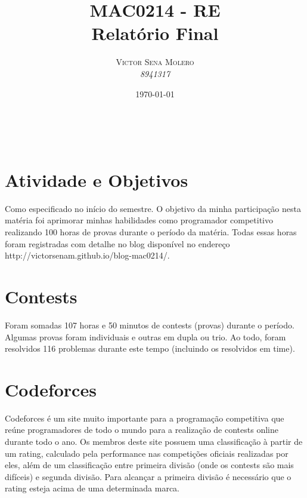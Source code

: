 \documentclass[a4paper, 11pt]{article} %
\title{\textbf{MAC0214 - RE}\\ %
Relatório Final} %
\author{\textsc{Victor Sena Molero} %
\\{\textit{8941317}}} %
\date{\today} %
\makeatletter
\renewcommand{\maketitle}{ %
\begin{flushright} %
{\LARGE\@title} %

\vspace{50pt} %

{\large\@author} %
\\\@date %

\vspace{40pt} %
\end{flushright}
}
\makeatother
\begin{document}
\maketitle %


\section*{Atividade e Objetivos}
Como especificado no início do semestre. O objetivo da minha participação nesta matéria foi aprimorar minhas habilidades como programador competitivo realizando 100 horas de provas durante o período da matéria. Todas essas horas foram registradas com detalhe no blog disponível no endereço http://victorsenam.github.io/blog-mac0214/.


\section*{Contests}
Foram somadas 107 horas e 50 minutos de contests (provas) durante o período. Algumas provas foram individuais e outras em dupla ou trio. Ao todo, foram resolvidos 116 problemas durante este tempo (incluindo os resolvidos em time).


\section*{Codeforces}
Codeforces é um site muito importante para a programação competitiva que reúne programadores de todo o mundo para a realização de contests online durante todo o ano. Os membros deste site possuem uma classificação à partir de um rating, calculado pela performance nas competições oficiais realizadas por eles, além de um classificação entre primeira divisão (onde os contests são mais difíceis) e segunda divisão. Para alcançar a primeira divisão é necessário que o rating esteja acima de uma determinada marca.
\end{document}

